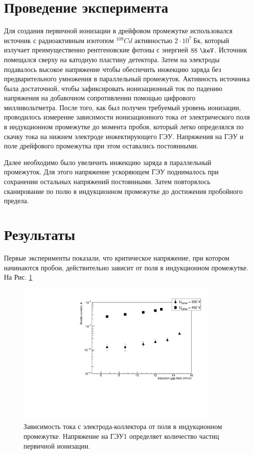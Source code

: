 \section{Проведение эксперимента}
Для создания первичной ионизации в дрейфовом промежутке использовался источник с радиоактивным изотопом $^{109}Cd$ активностью $2\cdot10^7~\text{Бк}$, который излучает преимущественно рентгеновские фотоны с энергией $88~\keV$. Источник помещался сверху на катодную пластину детектора. Затем на электроды подавалось высокое напряжение чтобы обеспечить инжекцию заряда без предварительного умножения в параллельный промежуток. Активность источника была достаточной, чтобы  зафиксировать ионизационный ток по падению напряжения на добавочном сопротивлении помощью цифрового милливольтметра. После того, как был получен требуемый уровень ионизации, проводилось измерение зависимости ионизационного тока от электрического поля в индукционном промежутке до момента пробоя, который легко определялся по скачку тока на нижнем электроде инжектирующего ГЭУ. Напряжения на ГЭУ и поле дрейфового промежутка при этом оставались постоянными. 
\par Далее необходимо было увеличить инжекцию заряда в параллельный промежуток. Для этого напряжение ускоряющем ГЭУ поднималось при сохранении остальных напряжений постоянными. Затем повторялось сканирование по полю в индукционном промежутке до достижения пробойного предела.

\section{Результаты}
Первые эксперименты показали, что критическое напряжение, при котором начинаются пробои, действительно зависит от поля в индукционном промежутке. На Рис. \ref{Raether_graph_2}
\begin{figure}[t]
	\begin{center}
		\includegraphics[width = 10cm]{img/Raether_graph_2.pdf}
		\caption{Зависимость тока с электрода-коллектора от поля в индукционном промежутке. Напряжение на ГЭУ1 определяет количество частиц первичной ионизации.}
		\label{Raether_graph_2}
	\end{center}
\end{figure}

